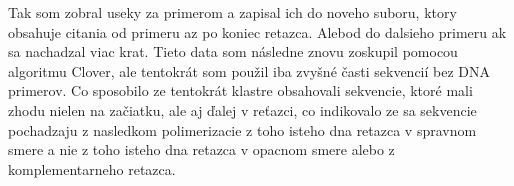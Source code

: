 
Tak som zobral useky za primerom a zapisal ich do noveho suboru, ktory obsahuje citania od primeru az po koniec retazca. Alebod do dalsieho primeru ak sa nachadzal viac krat.
Tieto data som následne znovu zoskupil pomocou algoritmu Clover, ale tentokrát som použil iba zvyšné časti sekvencií bez DNA primerov.
Co sposobilo ze tentokrát klastre obsahovali sekvencie, ktoré mali zhodu nielen na začiatku, ale aj ďalej v reťazci, co indikovalo ze sa sekvencie pochadzaju z nasledkom polimerizacie z toho isteho dna retazca v spravnom smere a nie z toho isteho dna retazca v opacnom smere alebo z komplementarneho retazca.
